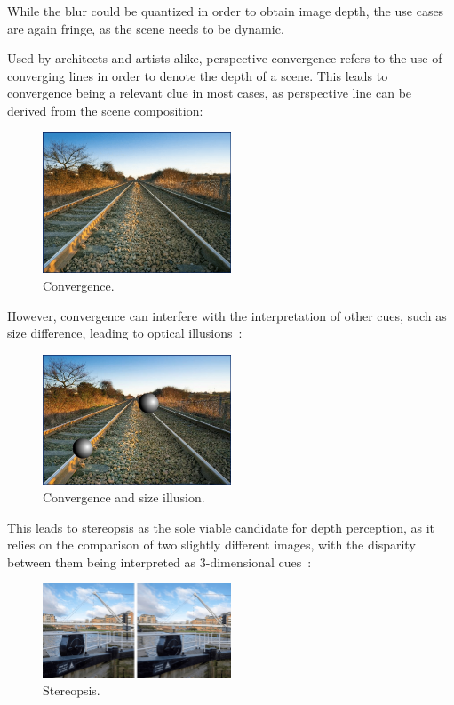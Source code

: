 While the blur could be quantized in order to obtain image depth, the use cases are
again fringe, as the scene needs to be dynamic.

Used by architects and artists alike, perspective convergence refers to the use of 
converging lines in order to denote the depth of a scene. This leads to convergence
being a relevant clue in most cases, as perspective line can be derived from the
scene composition:

\begin{figure}[H]
    \includegraphics[width=0.50\textwidth, height=0.25\textwidth]{resources/png/convergenceGood.png}
    \caption{Convergence.~\cite{withGeneralDepth}~\label{figGood}}
\end{figure}

However, convergence can interfere with the interpretation of other cues, such as 
size difference, leading to optical illusions~\cite{withGeneralDepth}:

\begin{figure}[H]
    \includegraphics[width=0.50\textwidth, height=0.25\textwidth]{resources/png/convergenceBad.png}
    \caption{Convergence and size illusion.~\cite{withGeneralDepth}~\label{figBad}}
\end{figure}

This leads to stereopsis as the sole viable candidate for depth perception,
as it relies on the comparison of two slightly different images, with the disparity
between them being interpreted as 3-dimensional cues~\cite{withGeneralDepth}:

\begin{figure}[H]
    \includegraphics[width=0.50\textwidth, height=0.25\textwidth]{resources/png/stereopsis.png}
    \caption{Stereopsis.~\cite{withGeneralDepth}~\label{figStereo}}
\end{figure}

